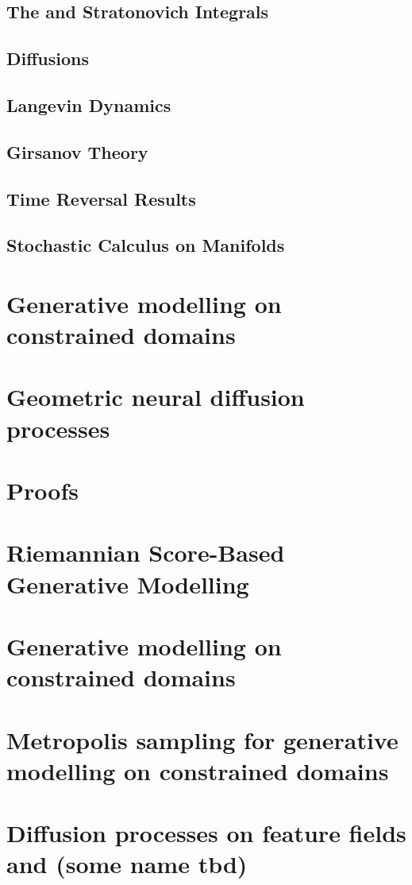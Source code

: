 \documentclass[10pt]{book}
\begin{document}
\section{The \ito and Stratonovich Integrals}
\section{\ito Diffusions}
\section{Langevin Dynamics}
\section{Girsanov Theory}
\section{Time Reversal Results}
\section{Stochastic Calculus on Manifolds}


\chapter{Generative modelling on constrained domains}
\chapter{Geometric neural diffusion processes}


\printbibliography

\appendix
\chapter{Proofs}

\chapter{Riemannian Score-Based Generative Modelling}

\chapter{Generative modelling on constrained domains}

\chapter{Metropolis sampling for generative modelling on constrained domains}

\chapter{Diffusion processes on feature fields and (some name tbd)}

\end{document}
